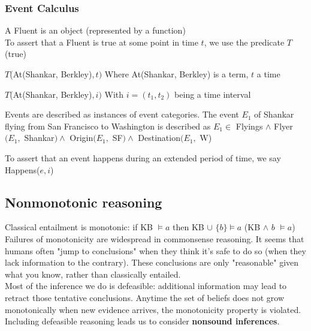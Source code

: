 \documentclass[10pt]{report}
\begin{document}
\subsubsection{Event Calculus}
\begin{list}{}{}
	\item A Fluent is an object (represented by a function)\\
	To assert that a Fluent is true at some point in time $t$, we use the predicate $T$ (true)
	\begin{list}{}{}
		\item $T$(At(Shankar, Berkley)$, t)$
		Where  At(Shankar, Berkley) is a term, $t$ a time
		\item $T$(At(Shankar, Berkley)$, i)$
		With $i = (t_1, t_2)$ being a time interval
	\end{list}
	\item Events are described as instances of event categories. The event $E_1$ of Shankar flying from San Francisco to Washington is described as $E_1\in$ Flyings $\wedge$ Flyer$(E_1,$ Shankar$)\wedge$ Origin$(E_1,$ SF$)\wedge$ Destination$(E_1,$ W)
	\item To assert that an event happens during an extended period of time, we say Happens($e,i$)
\end{list}
\subsection{Nonmonotonic reasoning}
Classical entailment is monotonic: if KB $\vDash a$ then KB $\cup$ $\{b\}\vDash a$ (KB $\wedge$ $b$ $\vDash a$)\\
Failures of monotonicity are widespread in commonsense reasoning. It seems that humans often "jump to conclusions" when they think it's safe to do so (when they lack information to the contrary). These conclusions are only "reasonable" given what you know, rather than classically entailed.\\
Most of the inference we do is defeasible: additional information may lead to retract those tentative conclusions. Anytime the set of beliefs does not grow monotonically when new evidence arrives, the monotonicity property is violated. Including defeasible reasoning leads us to consider \textbf{nonsound inferences}.
\end{document}

